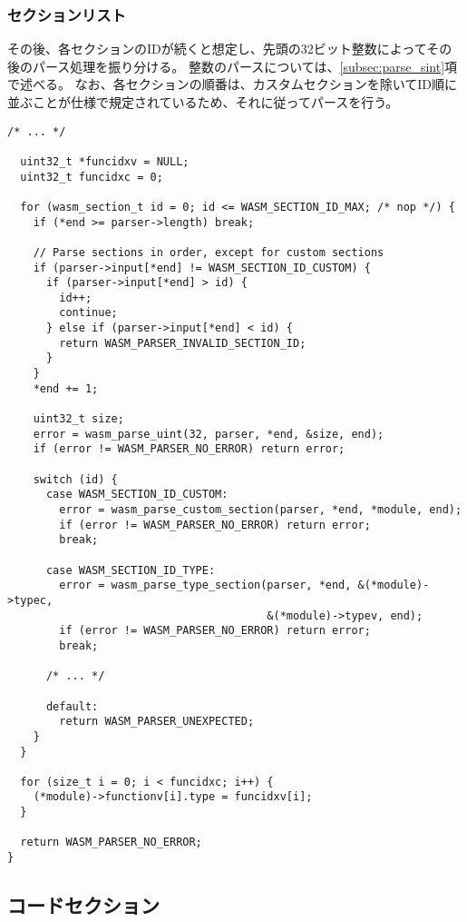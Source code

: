 \subsubsection{セクションリスト}

その後、各セクションのIDが続くと想定し、先頭の32ビット整数によってその後のパース処理を振り分ける。
整数のパースについては、\ref{subsec:parse_sint}項で述べる。
なお、各セクションの順番は、カスタムセクションを除いてID順に並ぶことが仕様で規定されているため、それに従ってパースを行う。

\begin{lstlisting}[caption=モジュールのパース,label=lst:parse_module_sections]
  /* ... */

  uint32_t *funcidxv = NULL;
  uint32_t funcidxc = 0;

  for (wasm_section_t id = 0; id <= WASM_SECTION_ID_MAX; /* nop */) {
    if (*end >= parser->length) break;

    // Parse sections in order, except for custom sections
    if (parser->input[*end] != WASM_SECTION_ID_CUSTOM) {
      if (parser->input[*end] > id) {
        id++;
        continue;
      } else if (parser->input[*end] < id) {
        return WASM_PARSER_INVALID_SECTION_ID;
      }
    }
    *end += 1;

    uint32_t size;
    error = wasm_parse_uint(32, parser, *end, &size, end);
    if (error != WASM_PARSER_NO_ERROR) return error;

    switch (id) {
      case WASM_SECTION_ID_CUSTOM:
        error = wasm_parse_custom_section(parser, *end, *module, end);
        if (error != WASM_PARSER_NO_ERROR) return error;
        break;

      case WASM_SECTION_ID_TYPE:
        error = wasm_parse_type_section(parser, *end, &(*module)->typec,
                                        &(*module)->typev, end);
        if (error != WASM_PARSER_NO_ERROR) return error;
        break;

      /* ... */

      default:
        return WASM_PARSER_UNEXPECTED;
    }
  }

  for (size_t i = 0; i < funcidxc; i++) {
    (*module)->functionv[i].type = funcidxv[i];
  }

  return WASM_PARSER_NO_ERROR;
}
\end{lstlisting}

\subsection{コードセクション}

